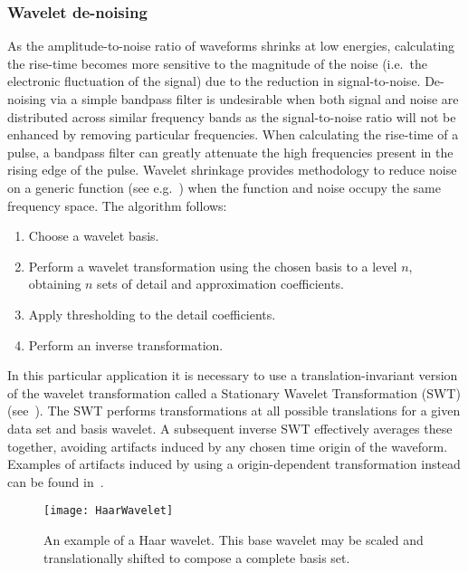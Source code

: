 			\subsubsection{Wavelet de-noising}
		     	\label{sec:RisetimeCutsWaveletDenoise}
					
	As the amplitude-to-noise ratio of waveforms shrinks at low energies, calculating the rise-time becomes more sensitive to the magnitude of the noise (i.e.~the electronic fluctuation of the signal) due to the reduction in signal-to-noise.   De-noising via a simple bandpass filter is undesirable when both signal and noise are distributed across similar frequency bands as the signal-to-noise ratio will not be enhanced by removing particular frequencies.  When calculating the rise-time of a pulse, a bandpass filter can greatly attenuate the high frequencies present in the rising edge of the pulse.  Wavelet shrinkage provides methodology to reduce noise on a generic function (see e.g.~\cite{Don95bb,Don95aa}) when the function and noise occupy the same frequency space.  The algorithm follows:
				\begin{enumerate}
					\item Choose a wavelet basis.
					\item Perform a wavelet transformation using the chosen basis to a level $n$, 
					obtaining $n$ sets of detail and approximation coefficients.
					\item Apply thresholding to the detail coefficients.
					\item Perform an inverse transformation.
				\end{enumerate}
	In this particular application it is necessary to use a translation-invariant version of the wavelet transformation called a Stationary Wavelet Transformation (SWT) (see~\cite{Coif95aa,Naso95aa}).  The SWT performs transformations at all possible translations for a given data set and basis wavelet.  A subsequent inverse SWT effectively averages these together, avoiding artifacts induced by any chosen time origin of the waveform.  Examples of artifacts induced by using a origin-dependent transformation instead can be found in~\cite{Coif95aa,Naso95aa}.
	
				\begin{figure}
					\centering
					\texttt{[image: HaarWavelet]}
					\caption[Haar wavelet]
					{An example of a Haar wavelet.  This base wavelet may be scaled and translationally shifted
					to compose a complete basis set.}
					\label{fig:HaarWavelet}
				\end{figure}					


